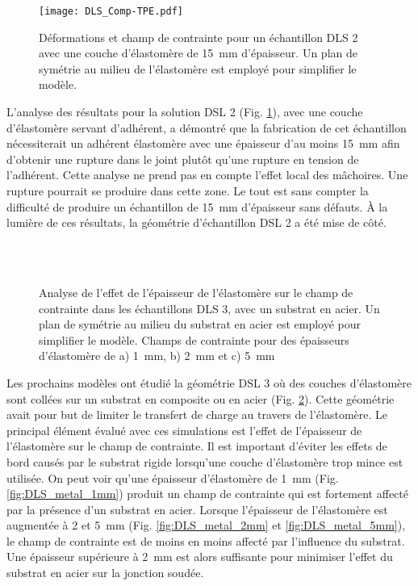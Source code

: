 \begin{figure}[h]
	\centering
	\texttt{[image: DLS\_Comp-TPE.pdf]}
	\caption{Déformations et champ de contrainte pour un échantillon DLS 2 avec une couche d'élastomère de \SI[locale=FR]{15}{\milli\metre} d'épaisseur. Un plan de symétrie au milieu de l'élastomère est employé pour simplifier le modèle.}
	\label{fig:DLS_comp_TPE}
\end{figure}
\FloatBarrier

L'analyse des résultats pour la solution DSL 2 (Fig. \ref{fig:DLS_comp_TPE}), avec une couche d'élastomère servant d'adhérent, a démontré que la fabrication de cet échantillon nécessiterait un adhérent élastomère avec une épaisseur d'au moins \SI[locale=FR]{15}{\milli\metre} afin d'obtenir une rupture dans le joint plutôt qu'une rupture en tension de l'adhérent. 
Cette analyse ne prend pas en compte l'effet local des mâchoires. 
Une rupture pourrait se produire dans cette zone. 
Le tout est sans compter la difficulté de produire un échantillon de \SI[locale=FR]{15}{\milli\metre} d'épaisseur sans défauts. 
À la lumière de ces résultats, la géométrie d'échantillon DSL 2 a été mise de côté.

\begin{figure}[h!]
	\centering
	 \\
	 \\
	\caption{Analyse de l'effet de l'épaisseur de l'élastomère sur le champ de contrainte dans les échantillons DLS 3, avec un substrat en acier. Un plan de symétrie au milieu du substrat en acier est employé pour simplifier le modèle. Champs de contrainte pour des épaisseurs d'élastomère de a) \SI{1}{\milli\metre}, b) \SI{2}{\milli\metre} et c) \SI{5}{\milli\metre}}
	\label{fig:DLS_metal}
\end{figure}

Les prochains modèles ont étudié la géométrie DSL 3 où des couches d'élastomère sont collées sur un substrat en composite ou en acier (Fig. \ref{fig:DLS_metal}). 
Cette géométrie avait pour but de limiter le transfert de charge au travers de l'élastomère. 
Le principal élément évalué avec ces simulations est l'effet de l'épaisseur de l'élastomère sur le champ de contrainte. 
Il est important d'éviter les effets de bord causés par le substrat rigide lorsqu'une couche d'élastomère trop mince est utilisée. 
On peut voir qu'une épaisseur d'élastomère de \SI[locale=FR]{1}{\milli\metre} (Fig. \ref{fig:DLS_metal_1mm}) produit un champ de contrainte qui est fortement affecté par la présence d'un substrat en acier. 
Lorsque l'épaisseur de l'élastomère est augmentée à 2 et \SI[locale=FR]{5}{\milli\metre} (Fig. \ref{fig:DLS_metal_2mm} et \ref{fig:DLS_metal_5mm}), le champ de contrainte est de moins en moins affecté par l'influence du substrat. 
Une épaisseur supérieure à \SI[locale=FR]{2}{\milli\metre} est alors suffisante pour minimiser l'effet du substrat en acier sur la jonction soudée. 

